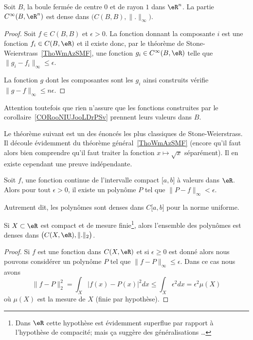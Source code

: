\begin{corollary}        \label{CORooNIUJooLDrPSv}
    Soit \( B\), la boule fermée de centre \( 0\) et de rayon \( 1\) dans \( \eR^n\). La partie \( C^{\infty}(B,\eR^n)\) est dense dans \( \big( C(B,B),\| . \|_{\infty} \big)\).
\end{corollary}

\begin{proof}
    Soit \( f \in C(B,B)\) et \( \epsilon>0\). La fonction donnant la composante \( i\) est une fonction \( f_i\in C(B,\eR)\) et il existe donc, par le théorème de Stone-Weierstrass~\ref{ThoWmAzSMF}, une fonction \( g_i\in  C^{\infty}(B,\eR)\) telle que \( \| g_i-f_i \|_{\infty}\leq \epsilon\).

    La fonction \( g\) dont les composantes sont les \( g_i\) ainsi construits vérifie \( \| g-f \|_{\infty}\leq n\epsilon\).
\end{proof}

Attention toutefois que rien n'assure que les fonctions construites par le corollaire~\ref{CORooNIUJooLDrPSv} prennent leurs valeurs dans \( B\).

Le théorème suivant est un des énoncés les plus classiques de Stone-Weierstrass. Il découle évidemment du théorème général~\ref{ThoWmAzSMF} (encore qu'il faut alors bien comprendre qu'il faut traiter la fonction \( x\mapsto \sqrt{x}\) séparément). Il en existe cependant une preuve indépendante.
\begin{theorem}     \label{ThoGddfas}   
    Soit \( f\), une fonction continue de l'intervalle compact \( \mathopen[ a , b \mathclose]\) à valeurs dans \( \eR\). Alors pour tout \( \epsilon>0\), il existe un polynôme \( P\) tel que \( \| P-f \|_{\infty}<\epsilon\).

    Autrement dit, les polynômes sont denses dans \( C\mathopen[ a , b \mathclose]\) pour la norme uniforme.
\end{theorem}

\begin{corollary}   \label{CorRSczQD}
    Si \( X\subset \eR\) est compact et de mesure finie\footnote{Dans \( \eR\) cette hypothèse est évidemment superflue par rapport à l'hypothèse de compacité; mais ça suggère des généralisations \ldots}, alors l'ensemble des polynômes est denses dans \( \big( C(X,\eR),\| . \|_2 \big)\).
\end{corollary}

\begin{proof}
    Si \( f\) est une fonction dans \( C(X,\eR)\) et si \( \epsilon\geq 0\) est donné alors nous pouvons considérer un polynôme \( P\) tel que \( \| f-P \|_{\infty}\leq \epsilon\). Dans ce cas nous avons
    \begin{equation}
        \| f-P \|_2^2=\int_X| f(x)-P(x) |^2dx\leq \int_X\epsilon^2dx=\epsilon^2\mu(X)
    \end{equation}
    où \( \mu(X)\) est la mesure de \( X\) (finie par hypothèse).
\end{proof}

